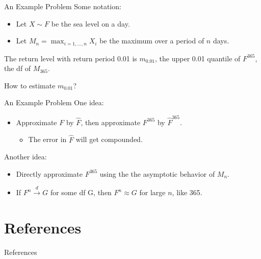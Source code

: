 \documentclass{beamer}
\begin{document}
\begin{frame}{An Example Problem}
    Some notation:
    \begin{itemize}
        \item Let $X \sim F$ be the sea level on a day.
        \item Let $M_n = \max_{i = 1, \ldots, n} X_i$ be the maximum over a period of $n$ days.
    \end{itemize}
    The return level with return period 0.01 is $m_{0.01}$, the upper 0.01 quantile of $F^{365}$, the df of $M_{365}$.

    \bigskip

    How to estimate $m_{0.01}$?
\end{frame}

\begin{frame}{An Example Problem}
    One idea:
    \begin{itemize}
        \item Approximate $F$ by $\hat{F}$, then approximate $F^{365}$ by $\hat{F}^{365}$.
        \begin{itemize}
            \item The error in $\hat{F}$ will get compounded.
        \end{itemize}
    \end{itemize}

    Another idea:
    \begin{itemize}
        \item Directly approximate $F^{365}$ using the the asymptotic behavior of $M_n$.
        \item If $F^n \xrightarrow{d} G$ for some df G, then $F^n \approx G$ for large $n$, like 365.
    \end{itemize}
\end{frame}

\section{References}

\begin{frame}[allowframebreaks]{References}
    \nocite{*}
    \printbibliography
\end{frame}
\end{document}
